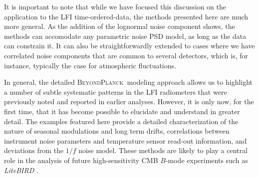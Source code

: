 \documentclass{aa}
\newcommand{\BP}{\textsc{BeyondPlanck}}
\begin{document}
It is important to note that while we have focused this discussion on the application to the LFI time-ordered-data, the methods presented here are much more general. As the addition of the lognormal noise component shows, the methods can accomodate any parametric noise PSD model, as long as the data can constrain it. It can also be straightforwardly extended to cases where we have correlated noise components that are common to several detectors, which is, for instance, typically the case for atmospheric fluctuations.

In general, the detailed \BP\ modeling approach allows us to
highlight a number of subtle systematic patterns in the LFI
radiometers that were previously noted and reported in earlier analyses. However, it is only now, for the first time, that it has become possible to elucidate and
understand in greater detail. The examples featured here provide a detailed characterization
of the nature of seasonal modulations and long term drifts,
correlations between instrument noise parameters and temperature
sensor read-out information, and deviations from the $1/f$ noise model. 
These methods are likely to play a
central role in the analysis of future high-sensitivity CMB $B$-mode
experiments such as \textit{LiteBIRD} \citep{litebird2020,litebird2022}.






\end{document}

